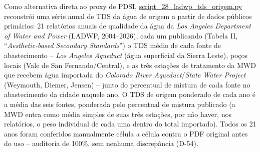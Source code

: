 Como alternativa direta ao proxy de PDSI, \url{script_28_ladwp_tds_origem.py} reconstrói uma série anual de TDS da água de origem a partir de dados públicos primários: 21 relatórios anuais de qualidade da água da \textit{Los Angeles Department of Water and Power} (LADWP, 2004--2026), cada um publicando (Tabela II, ``\textit{Aesthetic-based Secondary Standards}'') o TDS médio de cada fonte de abastecimento -- \textit{Los Angeles Aqueduct} (água superficial da Sierra Leste), poços locais (Vale de San Fernando/Central), e as três estações de tratamento da MWD que recebem água importada do \textit{Colorado River Aqueduct}/\textit{State Water Project} (Weymouth, Diemer, Jensen) -- junto do percentual de mistura de cada fonte no abastecimento da cidade naquele ano. O TDS de origem ponderado de cada ano é a média das seis fontes, ponderada pelo percentual de mistura publicado (a MWD entra como média simples de suas três estações, por não haver, nos relatórios, o peso individual de cada uma dentro do total importado). Todos os 21 anos foram conferidos manualmente célula a célula contra o PDF original antes do uso -- auditoria de 100\%, sem nenhuma discrepância (D-54).
